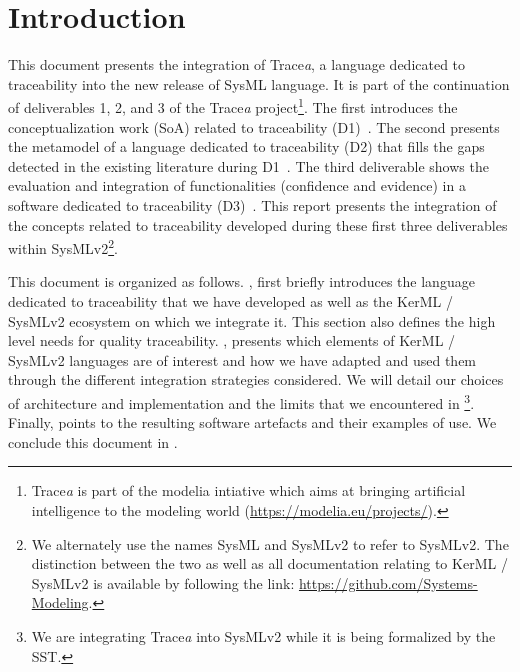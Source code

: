 
%	



\section{Introduction}\label{sect:intro}
This document presents the integration of Trace\textit{a}, a language dedicated to traceability into the new release of SysML language.
It is part of the continuation of deliverables 1, 2, and 3 of the Trace\textit{a} project\footnote{Trace\textit{a} is part of the modelia intiative which aims at bringing artificial intelligence to the modeling world (\url{https://modelia.eu/projects/}).}. The first introduces the conceptualization work (SoA) related to traceability (D1)~\cite{deliverable1}. The second presents the metamodel of a language dedicated to traceability (D2) that fills the gaps detected in the existing literature during D1~\cite{deliverable2}. The third deliverable shows the evaluation and integration of functionalities (confidence and evidence) in a software dedicated to traceability (D3)~\cite{deliverable3}.
This report presents the integration of the concepts related to traceability developed during these first three deliverables within SysMLv2\footnote{We alternately use the names SysML and SysMLv2 to refer to SysMLv2. The distinction between the two as well as all documentation relating to KerML / SysMLv2 is available by following the link: \url{https://github.com/Systems-Modeling}.}.

This document is organized as follows.
, first briefly introduces the language dedicated to traceability that we have developed as well as the KerML / SysMLv2 ecosystem on which we integrate it. This section also defines the high level needs for quality traceability.
, presents which elements of KerML / SysMLv2 languages are of interest and how we have adapted and used them through the different integration strategies considered.
We will detail our choices of architecture and implementation and the limits that we encountered in \footnote{We are integrating Trace\textit{a} into SysMLv2 while it is being formalized by the SST.}.
Finally,  points to the resulting software artefacts and their examples of use.
We conclude this document in .





